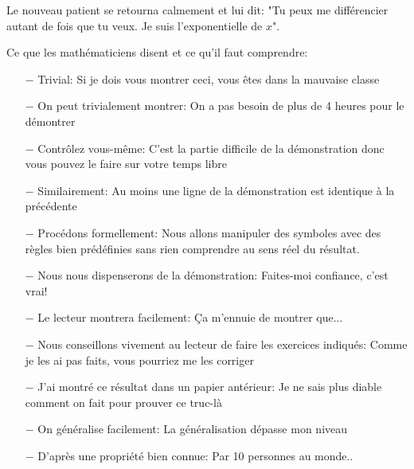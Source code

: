 Le nouveau patient se retourna calmement et lui dit: "Tu peux me différencier autant de fois que tu veux. Je suis l'exponentielle de $x$".

	\begin{center}\underline{\hspace{5 cm}}\end{center}	

Ce que les mathématiciens disent et ce qu'il faut comprendre:

\begin{itemize}	 
	\item[$-$] Trivial: Si je dois vous montrer ceci, vous êtes dans la mauvaise classe

	\item[$-$]  On peut trivialement montrer: On a pas besoin de plus de 4 heures pour le démontrer

	\item[$-$] Contrôlez vous-même: C'est la partie difficile de la démonstration donc vous pouvez le faire sur votre temps libre

	\item[$-$]  Similairement: Au moins une ligne de la démonstration est identique à la précédente

	\item[$-$]  Procédons formellement: Nous allons manipuler des symboles avec des règles bien prédéfinies sans rien comprendre au sens réel du résultat.

	\item[$-$]  Nous nous dispenserons de la démonstration: Faites-moi confiance, c'est vrai!

	\item[$-$]  Le lecteur montrera facilement: Ça m'ennuie de montrer que...

	\item[$-$]  Nous conseillons vivement au lecteur de faire les exercices indiqués: Comme je les ai pas faits, vous pourriez me les corriger

	\item[$-$]  J'ai montré ce résultat dans un papier antérieur: Je ne sais plus diable comment on fait pour prouver ce truc-là

	\item[$-$]  On généralise facilement: La généralisation dépasse mon niveau

	\item[$-$]  D'après une propriété bien connue: Par 10 personnes au monde..
\end{itemize}

